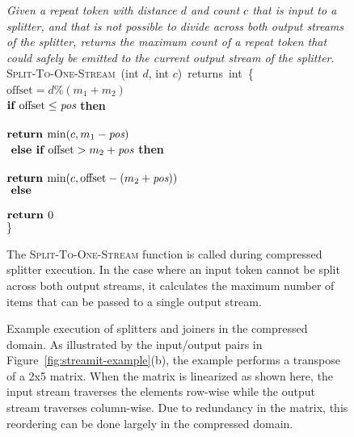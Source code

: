 \begin{figure}[t!]
\centering
\begin{minipage}{0.76\textwidth}
{\it Given a repeat token with distance $d$ and count $c$ that is
  input to a splitter, and that is not possible to divide across both
  output streams of the splitter, returns the maximum count of a
  repeat token that could safely be emitted to the current output
  stream of the splitter.}\\
\textsc{Split-To-One-Stream}~(int $d$, int $c$)~returns~int~\{\\
 $\mbox{offset} = d$\%$(m_1 + m_2)$\\
\tab$\mbox{{\bf if~}} \mbox{offset} \leq \mbox{\it pos}$ {\bf then}\\
\tab{}\\
\tab\tab$\mbox{\bf return~} \mbox{min}(c, m_1 - \mbox{\it pos})$\\
\tab$\mbox{\bf ~else if~} \mbox{offset} > m_2 + \mbox{\it pos}$ {\bf then}\\
\tab{}\\
\tab\tab$\mbox{\bf return~} \mbox{min}(c, \mbox{offset} - (m_2 + \mbox{\it pos}))$\\
\tab$\mbox{\bf ~else}$\\
\tab{}\\
\tab\tab$\mbox{\bf return~} 0$\\
\}
\end{minipage}
\caption[\textsc{Split-To-One-Stream} function for compressed splitter
  execution.]{The \textsc{Split-To-One-Stream} function is called during
  compressed splitter execution.  In the case where an input token
  cannot be split across both output streams, it calculates the
  maximum number of items that can be passed to a single output
  stream.\protect\label{fig:split-to-one-stream}}
\end{figure}

\begin{figure}[t!]
\caption[Example execution of splitters and joiners in the compressed
  domain.]{Example execution of splitters and joiners in the compressed
  domain.  As illustrated by the input/output pairs in
  Figure~\ref{fig:streamit-example}(b), the example performs a
  transpose of a 2x5 matrix.  When the matrix is linearized as shown
  here, the input stream traverses the elements row-wise while the
  output stream traverses column-wise.  Due to redundancy in the
  matrix, this reordering can be done largely in the compressed
  domain.  \protect\label{fig:sj-example}}
\end{figure}

